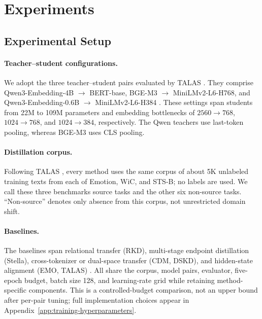 \section{Experiments}
\label{sec:experiments}

\subsection{Experimental Setup}
\label{sec:exp-setup}

\paragraph{Teacher--student configurations.}
We adopt the three teacher--student pairs evaluated by TALAS \citep{talas}.
They comprise Qwen3-Embedding-4B $\rightarrow$ BERT-base, BGE-M3
$\rightarrow$ MiniLMv2-L6-H768, and Qwen3-Embedding-0.6B $\rightarrow$
MiniLMv2-L6-H384
\citep{devlin2019bert,wang2021minilmv2,chen2024m3,zhang2025qwen3embedding}.
These settings span students from 22M to 109M parameters and embedding
bottlenecks of $2560\rightarrow768$, $1024\rightarrow768$, and
$1024\rightarrow384$, respectively. The Qwen teachers use last-token pooling,
whereas BGE-M3 uses CLS pooling.

\paragraph{Distillation corpus.}
Following TALAS \citep{talas}, every method uses the same corpus of about 5K
unlabeled training texts from each of Emotion, WiC, and STS-B; no labels are
used. We call these three benchmarks source tasks and the other six non-source
tasks. ``Non-source'' denotes only absence from this corpus, not unrestricted
domain shift.

\paragraph{Baselines.}
The baselines span relational transfer (RKD), multi-stage endpoint distillation
(Stella), cross-tokenizer or dual-space transfer (CDM, DSKD), and hidden-state
alignment (EMO, TALAS)
\citep{park2019rkd,zhang2024jasper,chen2025cdm,zhang2024dskd,truong2025emo,talas}.
All share the corpus, model pairs, evaluator, five-epoch budget, batch size 128,
and learning-rate grid while retaining method-specific components. This is a
controlled-budget comparison, not an upper bound after per-pair tuning; full
implementation choices appear in Appendix~\ref{app:training-hyperparameters}.

